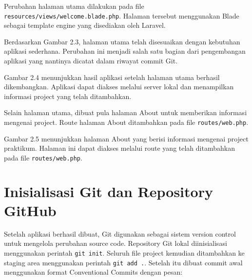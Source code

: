 Perubahan halaman utama dilakukan pada file \texttt{resources/views/welcome.blade.php}. Halaman tersebut menggunakan Blade sebagai template engine yang disediakan oleh Laravel.


Berdasarkan Gambar 2.3, halaman utama telah disesuaikan dengan kebutuhan aplikasi sederhana. Perubahan ini menjadi salah satu bagian dari pengembangan aplikasi yang nantinya dicatat dalam riwayat commit Git.


Gambar 2.4 menunjukkan hasil aplikasi setelah halaman utama berhasil dikembangkan. Aplikasi dapat diakses melalui server lokal dan menampilkan informasi project yang telah ditambahkan.

Selain halaman utama, dibuat pula halaman About untuk memberikan informasi mengenai project. Route halaman About ditambahkan pada file \texttt{routes/web.php}.


Gambar 2.5 menunjukkan halaman About yang berisi informasi mengenai project praktikum. Halaman ini dapat diakses melalui route yang telah ditambahkan pada file \texttt{routes/web.php}.

\section{Inisialisasi Git dan Repository GitHub}

Setelah aplikasi berhasil dibuat, Git digunakan sebagai sistem version control untuk mengelola perubahan source code. Repository Git lokal diinisialisasi menggunakan perintah \texttt{git init}. Seluruh file project kemudian ditambahkan ke staging area menggunakan perintah \texttt{git add .}. Setelah itu dibuat commit awal menggunakan format Conventional Commits dengan pesan:

